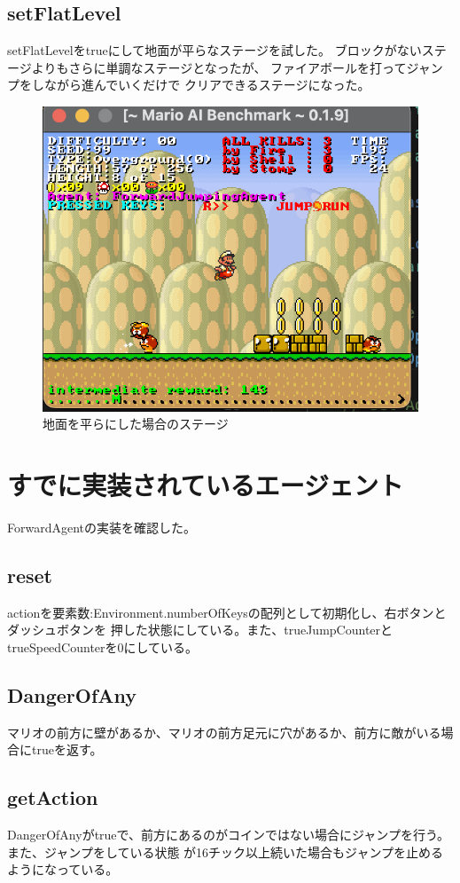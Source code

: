 \documentclass[a4paper,11pt]{jsarticle}
\begin{document}
\subsection*{setFlatLevel}
setFlatLevelをtrueにして地面が平らなステージを試した。
ブロックがないステージよりもさらに単調なステージとなったが、
ファイアボールを打ってジャンプをしながら進んでいくだけで
クリアできるステージになった。

\begin{figure}
  \centering
  \includegraphics*[scale=0.6]{
    images/report1/image-flat-stage.png
  }
  \caption[]{地面を平らにした場合のステージ}
\end{figure}

\section*{すでに実装されているエージェント}
ForwardAgentの実装を確認した。

\subsection*{reset}
actionを要素数:Environment.numberOfKeysの配列として初期化し、右ボタンとダッシュボタンを
押した状態にしている。また、trueJumpCounterとtrueSpeedCounterを0にしている。

\subsection*{DangerOfAny}
マリオの前方に壁があるか、マリオの前方足元に穴があるか、前方に敵がいる場合にtrueを返す。

\subsection*{getAction}
DangerOfAnyがtrueで、前方にあるのがコインではない場合にジャンプを行う。また、ジャンプをしている状態
が16チック以上続いた場合もジャンプを止めるようになっている。


\printbibliography[title=参考文献]
\end{document}
